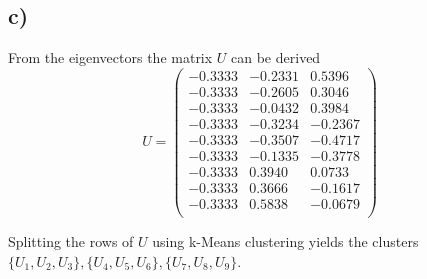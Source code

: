 \subsection*{c)}
From the eigenvectors the matrix $U$ can be derived\[U=\left(\begin{matrix}
-0.3333&  -0.2331&0.5396\\
-0.3333&	-0.2605&	0.3046\\
-0.3333&	-0.0432&	0.3984\\
-0.3333&	-0.3234&	-0.2367\\
-0.3333&	-0.3507&	-0.4717\\
-0.3333&	-0.1335&	-0.3778\\
-0.3333&	0.3940&	0.0733\\
-0.3333&	0.3666&	-0.1617\\
-0.3333&	0.5838&	-0.0679\\
\end{matrix}\right)\]

Splitting the rows of $U$ using k-Means clustering yields the clusters\\ $\lbrace U_1,U_2,U_3\rbrace,\lbrace U_4,U_5,U_6\rbrace,\lbrace U_7,U_8,U_9\rbrace$.